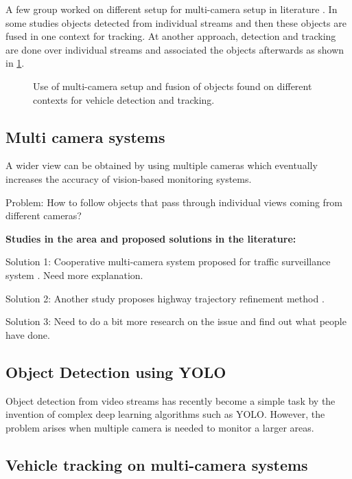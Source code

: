 \documentclass[5p,twocolumn,english]{elsarticle}
\begin{document}
A few group worked on different setup for multi-camera setup in literature \cite{olagoke}. In some studies objects detected from individual streams and then these objects are fused in one context for tracking. At another approach, detection and tracking are done over individual streams and associated the objects afterwards as shown in \ref{fig2}.

\begin{figure}[t]
	\centering
	\caption{Use of multi-camera setup and fusion of objects found on different contexts for vehicle detection and tracking.}
	\label{fig2}
\end{figure}

\subsection{Multi camera systems}

A wider view can be obtained by using multiple cameras which eventually increases the accuracy of vision-based monitoring systems. 
 
Problem: How to follow objects that pass through individual views coming from different cameras?

{\bf Studies in the area and proposed solutions in the literature:}

Solution 1: Cooperative multi-camera system proposed for traffic surveillance system \cite{YANG}. Need more explanation.  

Solution 2: Another study proposes highway trajectory refinement method \cite{zhang}.

Solution 3: Need to do a bit more research on the issue and find out what people have done.


\subsection{Object Detection using YOLO}

Object detection from video streams has recently become a simple task by the invention of complex deep learning algorithms such as YOLO. However, the problem arises when multiple camera is needed to monitor a larger areas.

\subsection{Vehicle tracking on multi-camera systems}
\end{document}
